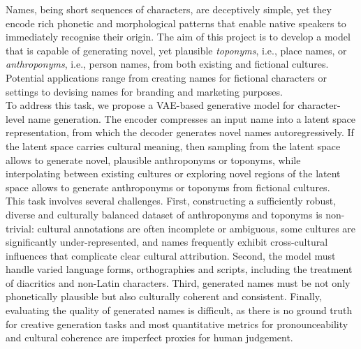 \documentclass[Main.tex]{subfiles}
\begin{document}
\label{ch:introduction}



Names, being short sequences of characters, are deceptively simple, yet they encode rich phonetic and morphological patterns that enable native speakers to immediately recognise their origin. The aim of this project is to develop a model that is capable of generating novel, yet plausible \textit{toponyms}, i.e., place names, or \textit{anthroponyms}, i.e., person names, from both existing and fictional cultures. Potential applications range from creating names for fictional characters or settings to devising names for branding and marketing purposes.\\

To address this task, we propose a VAE-based generative model for character-level name generation. The encoder compresses an input name into a latent space representation, from which the decoder generates novel names autoregressively. If the latent space carries cultural meaning, then sampling from the latent space allows to generate novel, plausible anthroponyms or toponyms, while interpolating between existing cultures or exploring novel regions of the latent space allows to generate anthroponyms or toponyms from fictional cultures.\\

This task involves several challenges. First, constructing a sufficiently robust, diverse and culturally balanced dataset of anthroponyms and toponyms is non-trivial: cultural annotations are often incomplete or ambiguous, some cultures are significantly under-represented, and names frequently exhibit cross-cultural influences that complicate clear cultural attribution. Second, the model must handle varied language forms, orthographies and scripts, including the treatment of diacritics and non-Latin characters. Third, generated names must be not only phonetically plausible but also culturally coherent and consistent. Finally, evaluating the quality of generated names is difficult, as there is no ground truth for creative generation tasks and most quantitative metrics for pronounceability and cultural coherence are imperfect proxies for human judgement.\\
\end{document}
